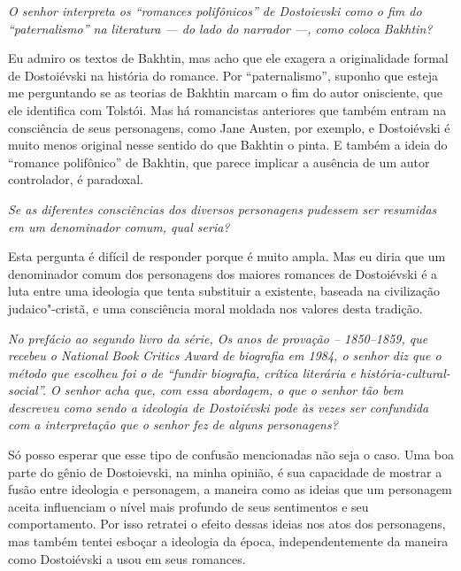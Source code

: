 {{\medskip

\emph{O senhor interpreta os ``romances polifônicos'' de Dostoievski como
o fim do ``paternalismo'' na literatura --- do lado do narrador ---,
como coloca Bakhtin?}

Eu admiro os textos de Bakhtin, mas acho que ele exagera a originalidade
formal de Dostoiévski na história do romance. Por ``paternalismo'',
suponho que esteja me perguntando se as teorias de Bakhtin marcam o fim
do autor onisciente, que ele identifica com Tolstói. Mas há romancistas
anteriores que também entram na consciência de seus personagens, como
Jane Austen, por exemplo, e Dostoiévski é muito menos original nesse
sentido do que Bakhtin o pinta. E também a ideia do ``romance polifônico''
de Bakhtin, que parece implicar a ausência de um autor controlador, é
paradoxal.

\medskip

\emph{Se as diferentes consciências dos diversos personagens pudessem ser
resumidas em um denominador comum, qual seria?}

Esta pergunta é difícil de responder porque é muito ampla. Mas eu diria
que um denominador comum dos personagens dos maiores romances de
Dostoiévski é a luta entre uma ideologia que tenta substituir a
existente, baseada na civilização judaico"-cristã, e uma consciência
moral moldada nos valores desta tradição.

\medskip

\emph{No prefácio ao segundo livro da série, \emph{Os anos de provação -- 1850--1859}, que recebeu o \emph{National Book Critics Award} de biografia em 1984, o
senhor diz que o método que escolheu foi o de ``fundir biografia, crítica
literária e história-cultural-social''. O senhor acha que, com essa
abordagem, o que o senhor tão bem descreveu como sendo a ideologia de
Dostoiévski pode às vezes ser confundida com a interpretação que o
senhor fez de alguns personagens?}

Só posso esperar que esse tipo de confusão mencionadas não seja o caso.
Uma boa parte do gênio de Dostoievski, na minha opinião, é sua
capacidade de mostrar a fusão entre ideologia e personagem, a maneira
como as ideias que um personagem aceita influenciam o nível mais
profundo de seus sentimentos e seu comportamento. Por isso retratei o
efeito dessas ideias nos atos dos personagens, mas também tentei esboçar
a ideologia da época, independentemente da maneira como Dostoiévski a
usou em seus romances.

\medskip

}}
